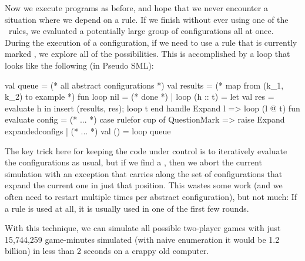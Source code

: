 \documentclass[twocolumn]{article}
\begin{document}
Now we execute programs as before, and hope that we never encounter a
situation where we depend on a rule. If we finish without ever using
one of the \any\ rules, we evaluated a potentially large group of
configurations all at once. During the execution of a configuration,
if we need to use a rule that is currently marked \any, we explore all
of the possibilities. This is accomplished by a loop that looks like
the following (in Pseudo SML):

\begin{code}
val queue = (* all abstract configurations *)
val results = (* map from (k_1, k_2) 
                 to example *)
\codeskip
fun loop nil = (* done *)
  | loop (h :: t) =
      let
        val res = evaluate h
      in
        insert (results, res);
        loop t
      end handle Expand l => loop (l @ t)
\codeskip
fun evaluate config =
   (* ... *) 
   case rulefor cup of 
      QuestionMark =>
         raise Expand expandedconfigs
    | (* ... *)
\codeskip
val () = loop queue
\end{code}

The key trick here for keeping the code under control is to
iteratively evaluate the configurations as usual, but if we find a
\any, then we abort the current simulation with an exception that
carries along the set of configurations that expand the current one in
just that position. This wastes some work (and we often need to
restart multiple times per abstract configuration), but not much: If a
rule is used at all, it is usually used in one of the first few
rounds.

With this technique, we can simulate all possible two-player games
with just 15,744,259 game-minutes simulated (with naive enumeration it
would be 1.2 billion) in less than 2 seconds on a crappy old computer.



\end{document}
